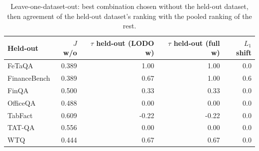 \begin{table}[t]
\centering
\footnotesize
\caption{Leave-one-dataset-out: best combination chosen without the held-out dataset, then agreement of the held-out dataset's ranking with the pooled ranking of the rest.}
\label{tab:lodo}

\begin{tabular}{lrrrr}
\toprule
Held-out & $J$ w/o & $\tau$ held-out (LODO w) & $\tau$ held-out (full w) & $L_1$ shift \\
\midrule
FeTaQA & 0.389 & 1.00 & 1.00 & 0.0 \\
FinanceBench & 0.389 & 0.67 & 1.00 & 0.6 \\
FinQA & 0.500 & 0.33 & 0.33 & 0.0 \\
OfficeQA & 0.488 & 0.00 & 0.00 & 0.0 \\
TabFact & 0.609 & -0.22 & -0.22 & 0.0 \\
TAT-QA & 0.556 & 0.00 & 0.00 & 0.0 \\
WTQ & 0.444 & 0.67 & 0.67 & 0.0 \\
\bottomrule
\end{tabular}

\end{table}